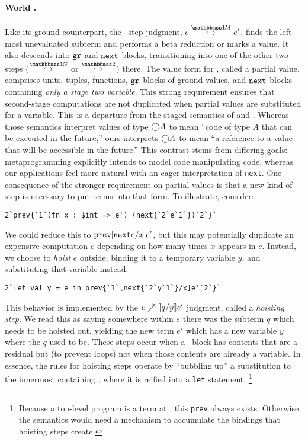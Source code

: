 \begin{abstrsyn}
\paragraph{World \bbonem.}
Like its ground counterpart, the \bbonem\ step judgment, $\stepmix e {e'}$, finds the left-most unevaluated subterm and performs a beta reduction or marks a value.
It also descends into ${\tt gr}$ and ${\tt next}$ blocks, transitioning into one of the other two steps ($\stepsym \bbonep$ or $\stepsym \bbtwo$) there. 
The value form for \bbonem, called a partial value, comprises units, tuples, functions, ${\tt gr}$ blocks of ground values, and ${\tt next}$ blocks containing \emph{only a stage two variable}.
This strong requirement ensures that second-stage computations are not duplicated 
when partial values are substituted for a variable.
This is a departure from the staged semantics of \cite{taha-thesis-99} and \cite{davies96}.
Whereas those semantics interpret values of type $\bigcirc A$ to mean ``code of type $A$ that can be executed in the future,''
ours interprets $\bigcirc A$ to mean ``a reference to a value that will be accessible in the future.''
This contrast stems from differing goals: metaprogramming explicitly intends to model code manipulating code,
whereas our applications feel more natural with an eager interpretation of {\tt next}.
One consequence of the stronger requirement on partial values is that a new kind of step is necessary to put terms into that form.
To illustrate, consider:
\begin{lstlisting}
2`prev{`1`(fn x : $int => e') (next{`2`e`1`})`2`}`
\end{lstlisting}
We could reduce this to ${\tt prev}{[{\tt next} e/x]e'}$, but this may potentially duplicate an
expensive computation $e$ depending on how many times $x$ appears in $e$. 
Instead, we choose to \emph{hoist} $e$ outside, binding it
to a temporary variable $y$, and substituting that variable instead:
\begin{lstlisting} 
2`let val y = e in prev{`1`[next{`2`y`1`}/x]e'`2`}`
\end{lstlisting}\end{abstrsyn}
This behavior is implemented by the ${e}\nearrow \llbracket q/y \rrbracket{e'}$ judgment, called a \emph{hoisting step}.
We read this as saying somewhere within $e$ there was the subterm $q$ which needs to be hoisted out,
yielding the new term $e'$ which has a new variable $y$ where the $q$ used to be.
These steps occur when a \next\ block has contents that are a residual but (to prevent loops) not when those contents are already a variable.
In essence, the rules for hoisting steps operate by ``bubbling up'' a substitution to the innermost containing \prev,
where it is reified into a {\tt let} statement.
\footnote{Because a top-level program is a term at \bbtwo, this {\tt prev} always exists.
Otherwise, the semantics would need a mechanism to accumulate the bindings that hoisting steps create.}

